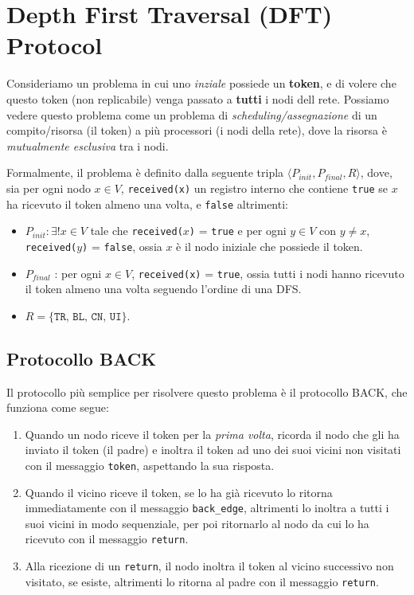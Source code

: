 \chapter{Depth First Traversal (DFT) Protocol}

Consideriamo un problema in cui uno \textit{inziale} possiede un \textbf{token}, e di volere che questo token (non replicabile) venga passato a \textbf{tutti} i nodi dell rete. Possiamo vedere questo problema come un problema di \textit{scheduling/assegnazione} di un compito/risorsa (il token) a più processori (i nodi della rete), dove la risorsa è \textit{mutualmente esclusiva} tra i nodi.

Formalmente, il problema è definito dalla seguente tripla $\langle P_{init}, P_{final}, R \rangle$, dove, sia per ogni nodo $x \in V$, \texttt{received(x)} un registro interno che contiene \texttt{true} se $x$ ha ricevuto il token almeno una volta, e \texttt{false} altrimenti:
\begin{itemize}
    \item $P_{init}: \exists! x \in V$ tale che \texttt{received($x$)} = \texttt{true} e per ogni $y \in V$ con $y \neq x$, \texttt{received($y$)} = \texttt{false}, ossia $x$ è il nodo iniziale che possiede il token.
    \item $P_{final}$ : per ogni $x \in V$, \texttt{received(x)} = \texttt{true}, ossia tutti i nodi hanno ricevuto il token almeno una volta seguendo l'ordine di una DFS.
    \item $R=\{ \texttt{TR, BL, CN, UI} \}$.
\end{itemize}

\section{Protocollo BACK}

Il protocollo più semplice per risolvere questo problema è il protocollo BACK, che funziona come segue:
\begin{enumerate}
    \item Quando un nodo riceve il token per la \textit{prima volta}, ricorda il nodo che gli ha inviato il token (il padre) e inoltra il token ad uno dei suoi vicini non visitati con il messaggio \texttt{token}, aspettando la sua risposta.
    \item  Quando il vicino riceve il token, se lo ha già ricevuto lo ritorna immediatamente con il messaggio \texttt{back\_edge}, altrimenti lo inoltra a tutti i suoi vicini in modo sequenziale, per poi ritornarlo al nodo da cui lo ha ricevuto con il messaggio \texttt{return}.
    \item Alla ricezione di un \texttt{return}, il nodo inoltra il token al vicino successivo non visitato, se esiste, altrimenti lo ritorna al padre con il messaggio \texttt{return}.
\end{enumerate}

